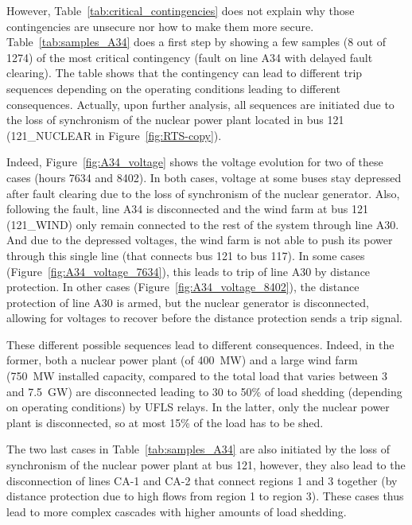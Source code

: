 However, Table~\ref{tab:critical_contingencies} does not explain why those contingencies are unsecure nor how to make them more secure. Table~\ref{tab:samples_A34} does a first step by showing a few samples (8 out of 1274) of the most critical contingency (fault on line A34 with delayed fault clearing). The table shows that the contingency can lead to different trip sequences depending on the operating conditions leading to different consequences. Actually, upon further analysis, all sequences are initiated due to the loss of synchronism of the nuclear power plant located in bus 121 (121\_NUCLEAR in Figure~\ref{fig:RTS-copy}).

Indeed, Figure~\ref{fig:A34_voltage} shows the voltage evolution for two of these cases (hours 7634 and 8402). In both cases, voltage at some buses stay depressed after fault clearing due to the loss of synchronism of the nuclear generator. Also, following the fault, line A34 is disconnected and the wind farm at bus 121 (121\_WIND) only remain connected to the rest of the system through line A30. And due to the depressed voltages, the wind farm is not able to push its power through this single line (that connects bus 121 to bus 117). In some cases (\eg Figure~\ref{fig:A34_voltage_7634}), this leads to trip of line A30 by distance protection. In other cases (\eg Figure~\ref{fig:A34_voltage_8402}), the distance protection of line A30 is armed, but the nuclear generator is disconnected, allowing for voltages to recover before the distance protection sends a trip signal.

These different possible sequences lead to different consequences. Indeed, in the former, both a nuclear power plant (of 400~MW) and a large wind farm (750~MW installed capacity, compared to the total load that varies between 3 and 7.5~GW) are disconnected leading to 30 to 50\% of load shedding (depending on operating conditions) by UFLS relays. In the latter, only the nuclear power plant is disconnected, so at most 15\% of the load has to be shed.

The two last cases in Table~\ref{tab:samples_A34} are also initiated by the loss of synchronism of the nuclear power plant at bus 121, however, they also lead to the disconnection of lines CA-1 and CA-2 that connect regions 1 and 3 together (by distance protection due to high flows from region 1 to region 3). These cases thus lead to more complex cascades with higher amounts of load shedding.



